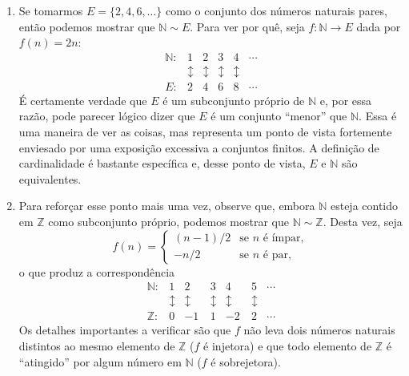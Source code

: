 \begin{example}\label{ex:N-sim-E-Z}
\hfill
\begin{enumerate}[label=\roman*)]
\item Se tomarmos $E = \{2, 4, 6, \dots\}$ como o conjunto dos números naturais pares, então podemos mostrar que $\mathbb{N} \sim E$. Para ver por quê, seja $f \colon \mathbb{N} \to E$ dada por $f(n) = 2n$: 
\[
\begin{array}{lccccc}
\mathbb{N}: & 1 & 2 & 3 & 4 & \cdots \\[0.15cm]
&\updownarrow & \updownarrow & \updownarrow & \updownarrow & \\[0.15cm]
E:&2 & 4 & 6 & 8 & \cdots
\end{array}
\]
É certamente verdade que $E$ é um subconjunto próprio de $\mathbb{N}$ e, por essa razão, pode parecer lógico dizer que $E$ é um conjunto ``menor'' que $\mathbb{N}$. Essa é uma maneira de ver as coisas, mas representa um ponto de vista fortemente enviesado por uma exposição excessiva a conjuntos finitos. A definição de cardinalidade é bastante específica e, desse ponto de vista, $E$ e $\mathbb{N}$ são equivalentes.

\item Para reforçar esse ponto mais uma vez, observe que, embora $\mathbb{N}$ esteja contido em $\mathbb{Z}$ como subconjunto próprio, podemos mostrar que $\mathbb{N} \sim \mathbb{Z}$. Desta vez, seja 
\[
f(n) = \begin{cases} (n-1)/2 & \text{se } n \text{ é ímpar}, \\ -n/2 & \text{se } n \text{ é par}, \end{cases}
\]
o que produz a correspondência
\[
\begin{array}{lcccccc}
\mathbb{N}:&1 & 2 & 3 & 4 & 5 & \cdots \\[0.15cm]
&\updownarrow & \updownarrow & \updownarrow & \updownarrow & \updownarrow & \\[0.15cm]
\mathbb{Z}:&0 & -1\ & 1 & -2\ & 2 & \cdots
\end{array}
\]
Os detalhes importantes a verificar são que $f$ não leva dois números naturais distintos ao mesmo elemento de $\mathbb{Z}$ ($f$ é injetora) e que todo elemento de $\mathbb{Z}$ é ``atingido'' por algum número em $\mathbb{N}$ ($f$ é sobrejetora).
\end{enumerate}
\end{example}

\bigskip 

